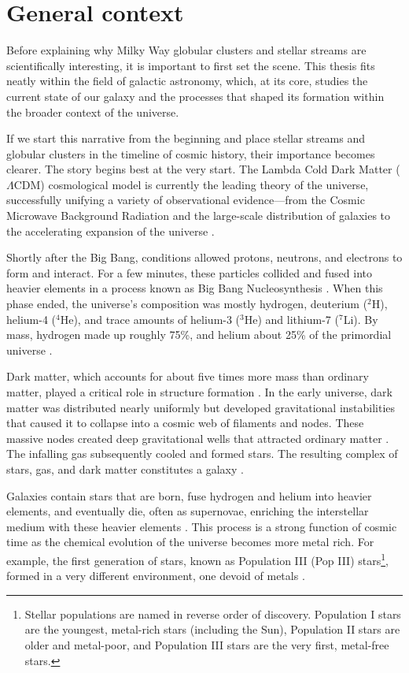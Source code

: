 \documentclass{article}
\begin{document}
\section{General context}
    Before explaining why Milky Way globular clusters and stellar streams are scientifically interesting, it is important to first set the scene. This thesis fits neatly within the field of galactic astronomy, which, at its core, studies the current state of our galaxy and the processes that shaped its formation within the broader context of the universe.

    If we start this narrative from the beginning and place stellar streams and globular clusters in the timeline of cosmic history, their importance becomes clearer. The story begins best at the very start. The Lambda Cold Dark Matter ($\Lambda$CDM) cosmological model is currently the leading theory of the universe, successfully unifying a variety of observational evidence—from the Cosmic Microwave Background Radiation and the large-scale distribution of galaxies to the accelerating expansion of the universe \citep{2001LRR.....4....1C,2022NewAR..9501659P}.

    Shortly after the Big Bang, conditions allowed protons, neutrons, and electrons to form and interact. For a few minutes, these particles collided and fused into heavier elements in a process known as Big Bang Nucleosynthesis \citep{2007ARNPS..57..463S}. When this phase ended, the universe's composition was mostly hydrogen, deuterium ($^2$H), helium-4 ($^4$He), and trace amounts of helium-3 ($^3$He) and lithium-7 ($^7$Li). By mass, hydrogen made up roughly 75\%, and helium about 25\% of the primordial universe \citep{1966ApJ...146..542P,2016RvMP...88a5004C}.

    Dark matter, which accounts for about five times more mass than ordinary matter, played a critical role in structure formation \citep{2020A&A...641A...6P}. In the early universe, dark matter was distributed nearly uniformly but developed gravitational instabilities that caused it to collapse into a cosmic web of filaments and nodes. These massive nodes created deep gravitational wells that attracted ordinary matter \citep{1974ApJ...187..425P}. The infalling gas subsequently cooled and formed stars. The resulting complex of stars, gas, and dark matter constitutes a galaxy \citep{2008LNP...740.....P,2010gfe..book.....M}.

    Galaxies contain stars that are born, fuse hydrogen and helium into heavier elements, and eventually die, often as supernovae, enriching the interstellar medium with these heavier elements \citep{2019A&ARv..27....3M}. This process is a strong function of cosmic time as the chemical evolution of the universe becomes more metal rich. For example, the first generation of stars, known as Population III (Pop III) stars\footnote{Stellar populations are named in reverse order of discovery. Population I stars are the youngest, metal-rich stars (including the Sun), Population II stars are older and metal-poor, and Population III stars are the very first, metal-free stars.}, formed in a very different environment, one devoid of metals \citep{2002Sci...295...93A,2005SSRv..117..445G,2013RPPh...76k2901B}. 
\end{document}
